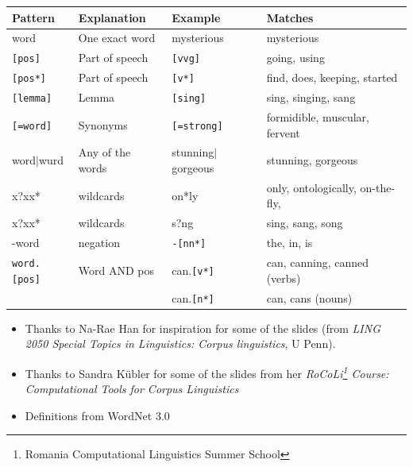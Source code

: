 \documentclass[a4paper,landscape,headrule,footrule,dvips]{foils}
\begin{document}
\begin{CJK}{UTF8}{min}
\begin{small}
  \begin{tabular}{llll}
    Pattern & Explanation & Example & Matches \\ \hline
    word & One exact word & mysterious  & mysterious \\
    \texttt{[pos]} & Part of speech & \texttt{[vvg]} & going, using \\
    \texttt{[pos*]} & Part of speech & \texttt{[v*]} & find, does, keeping, started  \\
    \texttt{[lemma]} & Lemma & \texttt{[sing]} & sing, singing, sang \\
    \texttt{[=word]} & Synonyms & \texttt{[=strong]} & 	formidible, muscular, fervent \\
    word$|$wurd & Any of the words & stunning$|$gorgeous & stunning, gorgeous \\
    x?xx* & wildcards & on*ly & only, ontologically, on-the-fly, \\
    x?xx* & wildcards & s?ng & sing, sang, song \\
    -word & negation & \texttt{-[nn*]} & the, in, is \\
    \texttt{word.[pos]} & Word AND pos& can.\texttt{[v*]} &can, canning, canned (verbs)\\ 
& & can.\texttt{[n*]} & can, cans (nouns)\\
  \end{tabular}
\end{small}






\begin{itemize}
\item Thanks to Na-Rae Han for 
  inspiration for some of the slides (from  \textit{LING 2050 Special Topics in Linguistics: Corpus linguistics}, U Penn).
\item Thanks to Sandra K\"{u}bler for some of the slides from her 
\textit{RoCoLi\footnote{Romania Computational Linguistics Summer School} Course: Computational Tools for Corpus Linguistics}
\item Definitions from WordNet 3.0
\end{itemize}



\clearpage
\end{CJK}
\end{document}
